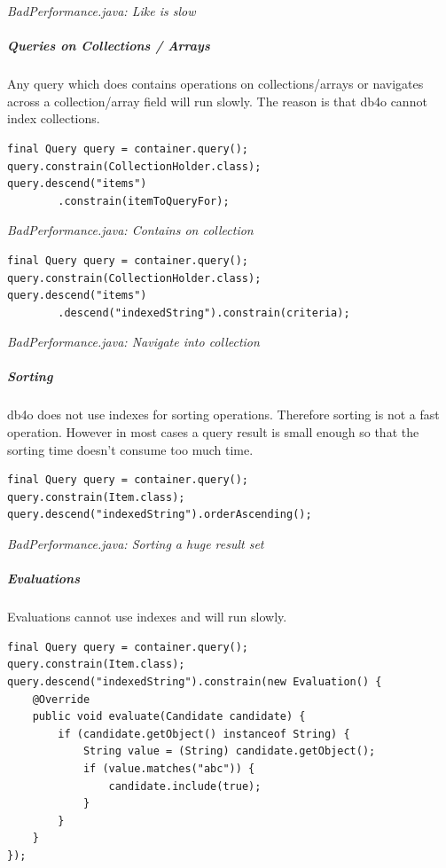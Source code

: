 {\small\itshape BadPerformance.java: Like is slow\par}
\medskip

\subparagraph*{Queries on Collections / Arrays}

Any query which does contains operations on collections/arrays or navigates across a collection/array field will run slowly. The reason is that db4o cannot index collections.

\begin{lstlisting}
final Query query = container.query();
query.constrain(CollectionHolder.class);
query.descend("items")
        .constrain(itemToQueryFor);
\end{lstlisting}

{\small\itshape BadPerformance.java: Contains on collection\par}
\medskip

\begin{lstlisting}
final Query query = container.query();
query.constrain(CollectionHolder.class);
query.descend("items")
        .descend("indexedString").constrain(criteria);
\end{lstlisting}

{\small\itshape BadPerformance.java: Navigate into collection\par}
\medskip

\subparagraph*{Sorting}

db4o does not use indexes for sorting operations. Therefore sorting is not a fast operation. However in most cases a query result is small enough so that the sorting time doesn't consume too much time.

\begin{lstlisting}
final Query query = container.query();
query.constrain(Item.class);
query.descend("indexedString").orderAscending();
\end{lstlisting}

{\small\itshape BadPerformance.java: Sorting a huge result set\par}
\medskip

\subparagraph*{Evaluations}

Evaluations cannot use indexes and will run slowly.

\begin{lstlisting}
final Query query = container.query();
query.constrain(Item.class);
query.descend("indexedString").constrain(new Evaluation() {
    @Override
    public void evaluate(Candidate candidate) {
        if (candidate.getObject() instanceof String) {
            String value = (String) candidate.getObject();
            if (value.matches("abc")) {
                candidate.include(true);
            }
        }
    }
});
\end{lstlisting}


